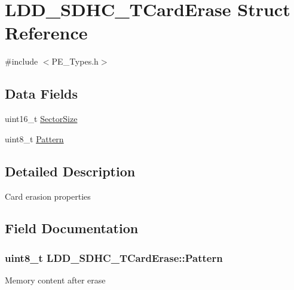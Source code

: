 \hypertarget{struct_l_d_d___s_d_h_c___t_card_erase}{}\section{L\+D\+D\+\_\+\+S\+D\+H\+C\+\_\+\+T\+Card\+Erase Struct Reference}
\label{struct_l_d_d___s_d_h_c___t_card_erase}


{\ttfamily \#include $<$P\+E\+\_\+\+Types.\+h$>$}

\subsection*{Data Fields}
\begin{DoxyCompactItemize}
\item 
uint16\+\_\+t \hyperlink{struct_l_d_d___s_d_h_c___t_card_erase_a3c0c33e89b65f4f6bfd6043585df5486}{Sector\+Size}
\item 
uint8\+\_\+t \hyperlink{struct_l_d_d___s_d_h_c___t_card_erase_a440e717a0c559282b7e277bf0872bee3}{Pattern}
\end{DoxyCompactItemize}


\subsection{Detailed Description}
Card erasion properties 

\subsection{Field Documentation}
\hypertarget{struct_l_d_d___s_d_h_c___t_card_erase_a440e717a0c559282b7e277bf0872bee3}{}
\subsubsection[{Pattern}]{\setlength{\rightskip}{0pt plus 5cm}uint8\+\_\+t L\+D\+D\+\_\+\+S\+D\+H\+C\+\_\+\+T\+Card\+Erase\+::\+Pattern}\label{struct_l_d_d___s_d_h_c___t_card_erase_a440e717a0c559282b7e277bf0872bee3}
Memory content after erase \hypertarget{struct_l_d_d___s_d_h_c___t_card_erase_a3c0c33e89b65f4f6bfd6043585df5486}{}
